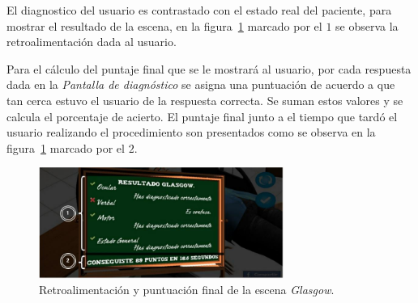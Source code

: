 El diagnostico del usuario es contrastado con el estado real del paciente, para
mostrar el resultado de la escena, en la figura~\ref{fig:glasgow_resultado}
marcado por el $1$ se observa la retroalimentación dada al usuario.

Para el cálculo del puntaje final que se le mostrará al usuario, por cada
respuesta dada en la \emph{Pantalla de diagnóstico} se asigna una puntuación de
acuerdo a que tan cerca estuvo el usuario de la respuesta correcta. Se suman
estos valores y se calcula el porcentaje de acierto. El puntaje final junto a el
tiempo que tardó el usuario realizando el procedimiento son presentados como se
observa en la figura~\ref{fig:glasgow_resultado} marcado por el $2$.

\begin{figure}
\centering
\includegraphics[width=8cm]{../solucion/images/glasgow_resultado.jpg}
\caption{Retroalimentación y puntuación final de la escena \emph{Glasgow}.}
\label{fig:glasgow_resultado}
\end{figure}
